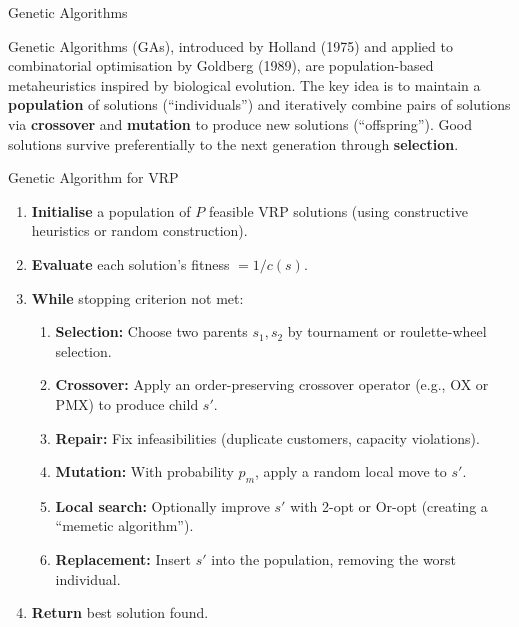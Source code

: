 \documentclass[aspectratio=169,10pt]{beamer}
\begin{document}
\begin{frame}[allowframebreaks]{Genetic Algorithms}

  Genetic Algorithms (GAs), introduced by Holland (1975) and applied to
  combinatorial optimisation by Goldberg (1989), are population-based
  metaheuristics inspired by biological evolution.  The key idea is to
  maintain a \textbf{population} of solutions (``individuals'') and
  iteratively combine pairs of solutions via \textbf{crossover} and
  \textbf{mutation} to produce new solutions (``offspring'').  Good
  solutions survive preferentially to the next generation through
  \textbf{selection}.

  \begin{block}{Genetic Algorithm for VRP}
    \begin{enumerate}
      \item \textbf{Initialise} a population of $P$ feasible VRP
            solutions (using constructive heuristics or random construction).
      \item \textbf{Evaluate} each solution's fitness $= 1 / c(s)$.
      \item \textbf{While} stopping criterion not met:
        \begin{enumerate}
          \item[(a)] \textbf{Selection:} Choose two parents $s_1, s_2$
                by tournament or roulette-wheel selection.
          \item[(b)] \textbf{Crossover:} Apply an order-preserving
                crossover operator (e.g., OX or PMX) to produce child $s'$.
          \item[(c)] \textbf{Repair:} Fix infeasibilities (duplicate
                customers, capacity violations).
          \item[(d)] \textbf{Mutation:} With probability $p_m$, apply a
                random local move to $s'$.
          \item[(e)] \textbf{Local search:} Optionally improve $s'$
                with 2-opt or Or-opt (creating a ``memetic algorithm'').
          \item[(f)] \textbf{Replacement:} Insert $s'$ into the
                population, removing the worst individual.
        \end{enumerate}
      \item \textbf{Return} best solution found.
    \end{enumerate}
  \end{block}


\end{frame}
\end{document}
